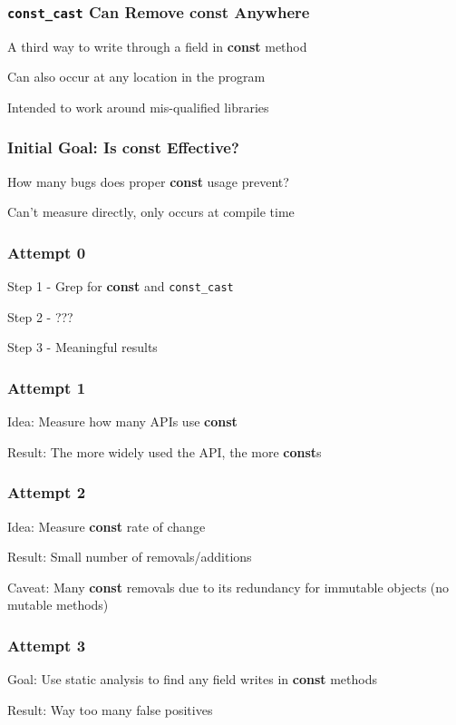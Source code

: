 \documentclass[aspectratio=43]{beamer}
\newcommand{\const}{{\color{blue} \bfseries \ttfamily const}}
\begin{document}
  \begin{frame}
    \frametitle{\texttt{const\_cast} Can Remove \const{} Anywhere}
    \large
    A third way to write through a field in \const{} method

    \vspace{2em}
    Can also occur at any location in the program

    \vspace{2em}
    Intended to work around mis-qualified libraries
  \end{frame}

  \begin{frame}
    \frametitle{Initial Goal: Is \const{} Effective?}

    How many bugs does proper \const{} usage prevent?

    \vspace{2em}
    Can't measure directly, only occurs at compile time
  \end{frame}

  \begin{frame}
    \frametitle{Attempt 0}

    Step 1 - Grep for \const{} and \texttt{const\_cast}

    \vspace{2em}
    Step 2 - ???

    \vspace{2em}
    Step 3 - Meaningful results
  \end{frame}

  \begin{frame}
    \frametitle{Attempt 1}

    Idea: Measure how many APIs use \const{}

    \vspace{2em}
    Result: The more widely used the API, the more \const{}s
  \end{frame}

  \begin{frame}
    \frametitle{Attempt 2}

    Idea: Measure \const{} rate of change

    \vspace{2em}
    Result: Small number of removals/additions

    \vspace{2em}
    Caveat: Many \const{} removals due to its redundancy for immutable objects (no mutable methods)
  \end{frame}

  \begin{frame}
    \frametitle{Attempt 3}

    Goal: Use static analysis to find any field writes in \const{} methods

    \vspace{2em}
    Result: Way too many false positives
  \end{frame}
\end{document}
